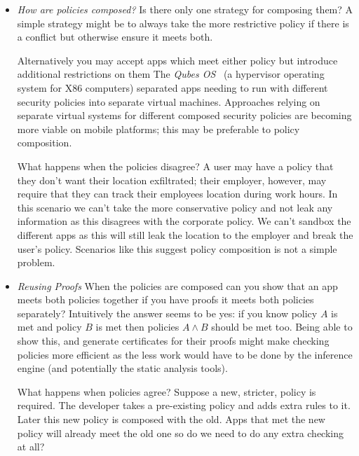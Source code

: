 \documentclass[a4paper]{article}
\begin{document}
\begin{description}
\begin{itemize}
      \item \emph{How are policies composed?}  Is there only one strategy for
        composing them?  A simple strategy might be to always take the more
        restrictive policy if there is a conflict but otherwise ensure it meets
        both.  
        
        Alternatively you may accept apps which meet either policy but
        introduce additional restrictions on them
        The \emph{Qubes OS}~\cite{Rutkowska:2010wr} (a hypervisor
        operating system for X86 computers) separated apps needing to run with
        different security policies into separate virtual machines.  Approaches
        relying on separate virtual systems for different composed security
        policies are becoming more viable on mobile platforms; this may be
        preferable to policy composition.

        What happens when the policies disagree?  A user may have a policy that
        they don't want their location exfiltrated; their employer, however, may
        require that they can track their employees location during work hours.  
        In this scenario we can't take the more conservative policy and not leak
        any information as this disagrees with the corporate policy.  We can't
        sandbox the different apps as this will still leak the location to the
        employer and break the user's policy.  Scenarios like this suggest
        policy composition is not a simple problem.

      \item \emph{Reusing Proofs}
        When the policies are composed can you show that an app meets both
        policies together if you have proofs it meets both policies separately?
        Intuitively the answer seems to be yes: if you know policy $A$ is met
        and policy $B$ is met then policies $A\wedge B$ should be met too.
        Being able to show this, and generate certificates for their proofs
        might make checking policies more efficient as the less work would have
        to be done by the inference engine (and potentially the static analysis
        tools).

        What happens when policies agree? Suppose a new, stricter,
        policy is required.  The developer takes a pre-existing policy and adds
        extra rules to it.  Later this new policy is composed with the old.
        Apps that met the new policy will already meet the old one so do we need
        to do any extra checking at all?  


\end{itemize}
\end{description}
\end{document}
